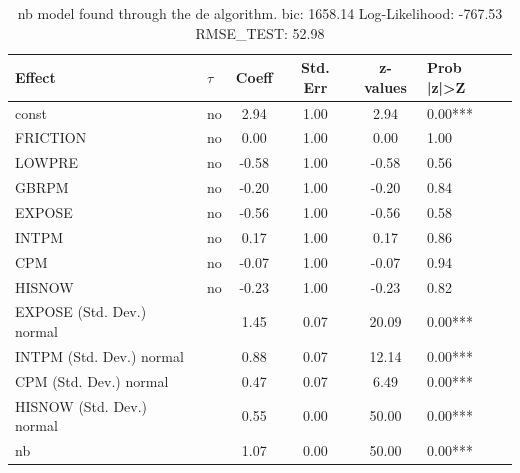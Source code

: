 \begin{table}
	\caption{nb model found through the de algorithm. bic: 1658.14 Log-Likelihood: -767.53 RMSE_TEST: 52.98}
	\begin{center}
		\begin{tabular}{|l|l|c|c|c|l|}
			\hline
			Effect & $\tau$ & Coeff & Std. Err & z-values & Prob |z|>Z \\
			\hline
			const & no & 2.94 & 1.00 & 2.94 & 0.00*** \\
			\hline
			FRICTION & no & 0.00 & 1.00 & 0.00 & 1.00 \\
			\hline
			LOWPRE & no & -0.58 & 1.00 & -0.58 & 0.56 \\
			\hline
			GBRPM & no & -0.20 & 1.00 & -0.20 & 0.84 \\
			\hline
			EXPOSE & no & -0.56 & 1.00 & -0.56 & 0.58 \\
			\hline
			INTPM & no & 0.17 & 1.00 & 0.17 & 0.86 \\
			\hline
			CPM & no & -0.07 & 1.00 & -0.07 & 0.94 \\
			\hline
			HISNOW & no & -0.23 & 1.00 & -0.23 & 0.82 \\
			\hline
			EXPOSE (Std. Dev.) normal &  & 1.45 & 0.07 & 20.09 & 0.00*** \\
			\hline
			INTPM (Std. Dev.) normal &  & 0.88 & 0.07 & 12.14 & 0.00*** \\
			\hline
			CPM (Std. Dev.) normal &  & 0.47 & 0.07 & 6.49 & 0.00*** \\
			\hline
			HISNOW (Std. Dev.) normal &  & 0.55 & 0.00 & 50.00 & 0.00*** \\
			\hline
			nb &  & 1.07 & 0.00 & 50.00 & 0.00*** \\
			\hline
		\end{tabular}
	\end{center}
\end{table}